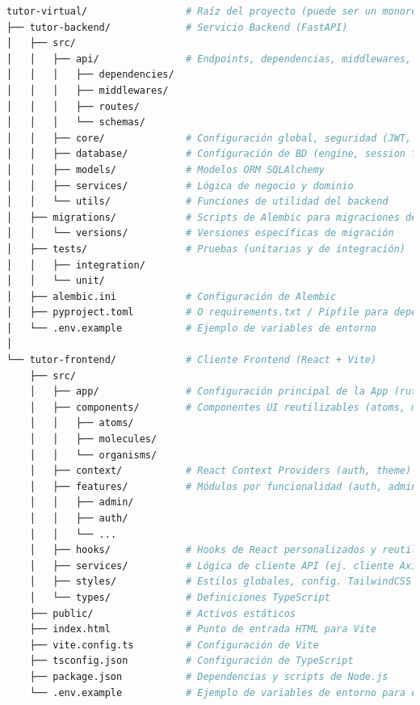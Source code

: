 \begin{lstlisting}[language=bash,caption={Estructura de directorios raíz simplificada del proyecto (snapshot inicial, commit 0d7fe1).},label={lst:desarrollo_tree-root},basicstyle=\fontsize{8}{9.5}\ttfamily]
tutor-virtual/                 # Raíz del proyecto (puede ser un monorepo o dos repos separados)
├── tutor-backend/             # Servicio Backend (FastAPI)
│   ├── src/
│   │   ├── api/               # Endpoints, dependencias, middlewares, schemas Pydantic
│   │   │   ├── dependencies/
│   │   │   ├── middlewares/
│   │   │   ├── routes/
│   │   │   └── schemas/
│   │   ├── core/              # Configuración global, seguridad (JWT, hashing)
│   │   ├── database/          # Configuración de BD (engine, session factory)
│   │   ├── models/            # Modelos ORM SQLAlchemy
│   │   ├── services/          # Lógica de negocio y dominio
│   │   └── utils/             # Funciones de utilidad del backend
│   ├── migrations/            # Scripts de Alembic para migraciones de BD
│   │   └── versions/          # Versiones específicas de migración
│   ├── tests/                 # Pruebas (unitarias y de integración)
│   │   ├── integration/
│   │   └── unit/
│   ├── alembic.ini            # Configuración de Alembic
│   ├── pyproject.toml         # O requirements.txt / Pipfile para dependencias Python
│   └── .env.example           # Ejemplo de variables de entorno
│
└── tutor-frontend/            # Cliente Frontend (React + Vite)
    ├── src/
    │   ├── app/               # Configuración principal de la App (rutas, guards)
    │   ├── components/        # Componentes UI reutilizables (atoms, molecules, organisms)
    │   │   ├── atoms/
    │   │   ├── molecules/
    │   │   └── organisms/
    │   ├── context/           # React Context Providers (auth, theme)
    │   ├── features/          # Módulos por funcionalidad (auth, admin, dashboard, etc.)
    │   │   ├── admin/
    │   │   ├── auth/
    │   │   └── ...
    │   ├── hooks/             # Hooks de React personalizados y reutilizables
    │   ├── services/          # Lógica de cliente API (ej. cliente Axios, funciones de servicio)
    │   ├── styles/            # Estilos globales, config. TailwindCSS
    │   └── types/             # Definiciones TypeScript
    ├── public/                # Activos estáticos
    ├── index.html             # Punto de entrada HTML para Vite
    ├── vite.config.ts         # Configuración de Vite
    ├── tsconfig.json          # Configuración de TypeScript
    ├── package.json           # Dependencias y scripts de Node.js
    └── .env.example           # Ejemplo de variables de entorno para el frontend
\end{lstlisting}

